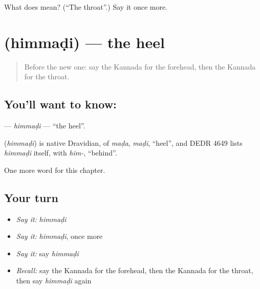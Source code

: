 \begin{tcolorbox}[breakable,colback=teal!4,colframe=teal!35!black,title={Before you move on}]
What does  mean? (\textquotedblleft{}The throat\textquotedblright{}.) Say it once more.
\end{tcolorbox}
\section[\texorpdfstring{\kn{ಹಿಮ್ಮಡಿ} (himmaḍi)}{ಹಿಮ್ಮಡಿ (himmaḍi)}]{ (himmaḍi) — the heel}

\label{lesson:KA-C168-himmadi}



\begin{quote}
Before the new one: say the Kannada for the forehead, then the Kannada for the throat.
\end{quote}

\subsection*{You'll want to know: }
\textbf{} — \emph{himmaḍi} — \textquotedblleft{}the heel\textquotedblright{}.

\begin{cousinweb}
\textbf{} (\emph{himmaḍi}) is native Dravidian, of \emph{maḍa}, \emph{maḍi}, \textquotedblleft{}heel\textquotedblright{}, and DEDR 4649 lists \emph{himmaḍi} itself, with \emph{him-}, \textquotedblleft{}behind\textquotedblright{}.
\end{cousinweb}

\begin{grammarlens}[title={What you've built}]
One more word for this chapter.
\end{grammarlens}

\subsection*{Your turn}
\begin{itemize}
\raggedright
  \item \emph{Say it:} \emph{himmaḍi}
  \item \emph{Say it:} \emph{himmaḍi}, once more
  \item \emph{Say it:} say \emph{himmaḍi}
  \item \emph{Recall:} say the Kannada for the forehead, then the Kannada for the throat, then say \emph{himmaḍi} again
\end{itemize}


